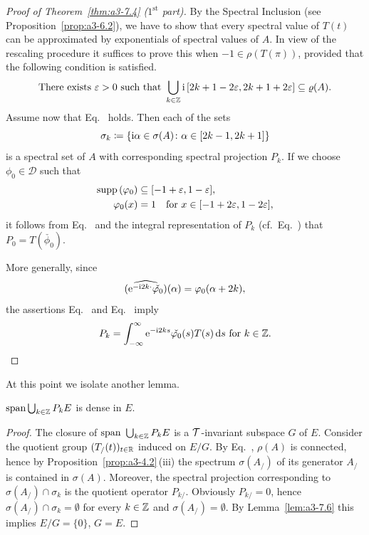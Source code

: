 \begin{proof}[Proof of Theorem~\ref{thm:a3-7.4} ($1^{\text{st}} $ part)]
By the Spectral Inclusion (see Proposition~\ref{prop:a3-6.2}), we have to show that every spectral value of\/ $T(t)$ can be approximated by exponentials of spectral values of\/ $A$.
In view of the rescaling procedure it suffices to prove this when $-1 \in \rho(T(\pi))$, provided that the following condition is satisfied.
\begin{equation}\label{eq:a3-7.4}
	\text{There exists } \epsilon > 0 \text{ such that } \bigcup_{k\in\Z} \im\,[2k+1-2\epsilon,2k+1+2\epsilon] \subseteq 	\rho(A) .
\end{equation}
Assume now that Eq.~ holds.
Then each of the sets 
\[
	\sigma_{k}\coloneq \{\mathrm{i}\alpha \in \sigma(A) \colon \alpha \in [2k-1,2k+1]\}
\] 
is a spectral set of\/ $A$ with corresponding spectral projection $P_{k}$.
If we choose $\phi_{0} \in \mathcal{D}$ such that 
\begin{align*}
	\supp(\phi_{0}) &\subseteq [-1+\epsilon,1-\epsilon], \\
	\phi_{0}(x) & = 1 \quad \text{for $x \in [-1 + 2\epsilon,1 - 2\epsilon]$}, 
\end{align*}
it follows from Eq.~ and the integral representation of\/ $P_{k}$ (cf.\ Eq.~) that $P_{0} = T(\check{\phi_{0}})$.

More generally, since %
\[
	\widehat{\left(\eu^{-\im 2k\cdot}\check{\phi_{0}}\right)}(\alpha) = \phi_{0}(\alpha+2k) ,
\]
%
the assertions Eq.~ and Eq.~ imply
\begin{equation}\label{eq:a3-7.5}
P_{k} = \int_{-\infty}^{\infty} \eu^{-\im 2ks}\check{\phi_{0}}(s)T(s)\ds \text{ for } k \in \Z .
\qedhere
\end{equation}
\end{proof}
At this point we isolate another lemma.
\begin{lemma}\label{lem:a3-7.7}
$\mathrm{span }\bigcup_{k\in\mathbb{Z}} P_{k}E$ is dense in $E$.
\end{lemma}
\begin{proof}
The closure of\/ $\text{span }\bigcup_{k\in\mathbb{Z}} P_{k}E$ is a $\mathcal{T}$-invariant subspace $G$ of\/ $E$.
Consider the quotient group $(T_/(t))_{t\in\mathbb{R}}$ induced on $E/G$.
By Eq.~, $\rho(A)$ is connected, hence by Proposition~\ref{prop:a3-4.2}\,(iii) the spectrum $\sigma(A_{/})$ of its generator $A_{/}$ is contained in $\sigma(A)$.
Moreover, the spectral projection corresponding to $\sigma(A_{/}) \cap \sigma_{k}$ is the quotient operator $P_{k/}$.
Obviously $P_{k/} = 0$, hence $\sigma(A_{/}) \cap \sigma_{k} = \emptyset$ for every $k \in \mathbb{Z}$ and $\sigma(A_{/}) = \emptyset$.
By Lemma~\ref{lem:a3-7.6} this implies $E/G = \{0\}$, \ie $G = E$.
\end{proof}
